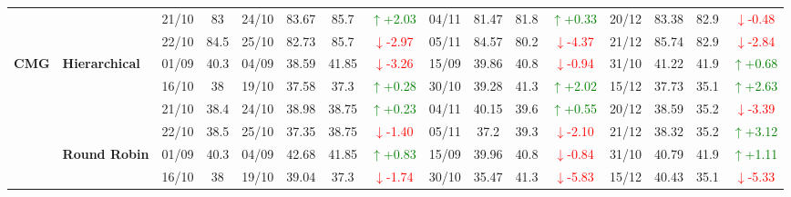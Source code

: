 \documentclass{ieeeaccess}
\begin{document}
{\begin{longtable}{llcc|cccc|cccc|cccc}
&
& 21/10 & 83 & 24/10 & 83.67 & 85.7 & \textcolor{green}{\(\uparrow\)+2.03} & 04/11 & 81.47 & 81.8 & \textcolor{green}{\(\uparrow\)+0.33} & 20/12 & 83.38 & 82.9 & \textcolor{red}{\(\downarrow\)-0.48} \\

&
& 22/10 & 84.5 & 25/10 & 82.73 & 85.7 & \textcolor{red}{\(\downarrow\)-2.97} & 05/11 & 84.57 & 80.2 & \textcolor{red}{\(\downarrow\)-4.37} & 21/12 & 85.74 & 82.9 & \textcolor{red}{\(\downarrow\)-2.84} \\




\midrule


\multirow{12}{*}{\textbf{CMG}} 
& \textbf{Hierarchical}
& 01/09 & 40.3 & 04/09 & 38.59 & 41.85 & \textcolor{red}{\(\downarrow\)-3.26} & 15/09 & 39.86 & 40.8 & \textcolor{red}{\(\downarrow\)-0.94} & 31/10 & 41.22 & 41.9 & \textcolor{green}{\(\uparrow\)+0.68} \\

& 
& 16/10 & 38 & 19/10 & 37.58 & 37.3 & \textcolor{green}{\(\uparrow\)+0.28} & 30/10 & 39.28 & 41.3 & \textcolor{green}{\(\uparrow\)+2.02} & 15/12 & 37.73 & 35.1 & \textcolor{green}{\(\uparrow\)+2.63} \\

& 
& 21/10 & 38.4 & 24/10 & 38.98 & 38.75 & \textcolor{green}{\(\uparrow\)+0.23} & 04/11 & 40.15 & 39.6 & \textcolor{green}{\(\uparrow\)+0.55} & 20/12 & 38.59 & 35.2 & \textcolor{red}{\(\downarrow\)-3.39} \\

&
& 22/10 & 38.5 & 25/10 & 37.35 & 38.75 & \textcolor{red}{\(\downarrow\)-1.40} & 05/11 & 37.2 & 39.3 & \textcolor{red}{\(\downarrow\)-2.10} & 21/12 & 38.32 & 35.2 & \textcolor{green}{\(\uparrow\)+3.12} \\
\cmidrule(lr){2-16}


& \textbf{Round Robin}
& 01/09 & 40.3 & 04/09 & 42.68 & 41.85 & \textcolor{green}{\(\uparrow\)+0.83} & 15/09 & 39.96 & 40.8 & \textcolor{red}{\(\downarrow\)-0.84} & 31/10 & 40.79 & 41.9 & \textcolor{green}{\(\uparrow\)+1.11} \\

& 
& 16/10 & 38 & 19/10 & 39.04 & 37.3 & \textcolor{red}{\(\downarrow\)-1.74} & 30/10 & 35.47 & 41.3 & \textcolor{red}{\(\downarrow\)-5.83} & 15/12 & 40.43 & 35.1 & \textcolor{red}{\(\downarrow\)-5.33} \\


\end{longtable}}
\end{document}
